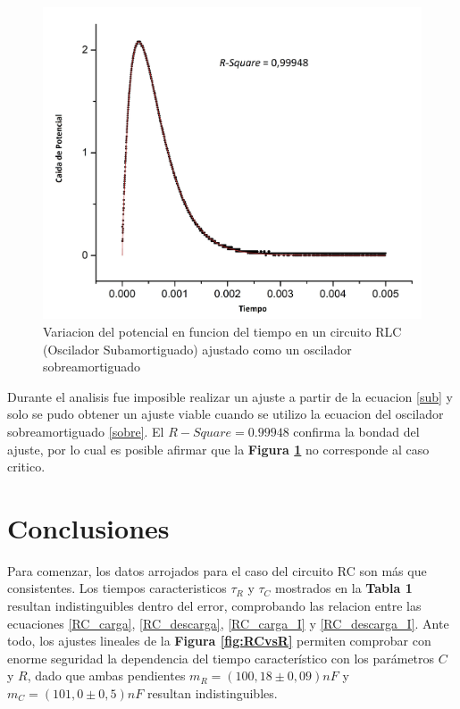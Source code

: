 \documentclass[11pt,a4paper]{article}
\begin{document}
\begin{figure}[H]
\centering
\includegraphics[scale=0.49]{RLC-Amortiguado_Critico(MasPiola)}
  \caption{Variacion del potencial en funcion del tiempo en un circuito RLC (Oscilador Subamortiguado) ajustado como un oscilador sobreamortiguado}
  \label{fig:RLC-sA}
\end{figure}

Durante el analisis fue imposible realizar un ajuste a partir de la ecuacion \eqref{sub} y solo se pudo obtener un ajuste viable cuando se utilizo la ecuacion del oscilador sobreamortiguado \eqref{sobre}. El $R-Square = 0.99948$ confirma la bondad del ajuste, por lo cual es posible afirmar que la \textbf{Figura \ref{fig:RLC-sA}} no corresponde al caso critico.




\section{Conclusiones}
\label{sec:conclusiones}

Para comenzar, los datos arrojados para el caso del circuito RC son más que consistentes. Los tiempos caracteristicos $\tau_R$ y $\tau_C$ mostrados en la \textbf{Tabla 1} resultan indistinguibles dentro del error, comprobando las relacion entre las ecuaciones \eqref{RC_carga}, \eqref{RC_descarga}, \eqref{RC_carga_I} y \eqref{RC_descarga_I}. Ante todo, los ajustes lineales de la \textbf{Figura \ref{fig:RCvsR}} permiten comprobar con enorme seguridad la dependencia del tiempo característico con los parámetros $C$ y $R$, dado que ambas pendientes $m_R = (100,18 \pm 0,09)nF$ y $m_C = (101,0 \pm 0,5)nF$ resultan indistinguibles.
\end{document}

